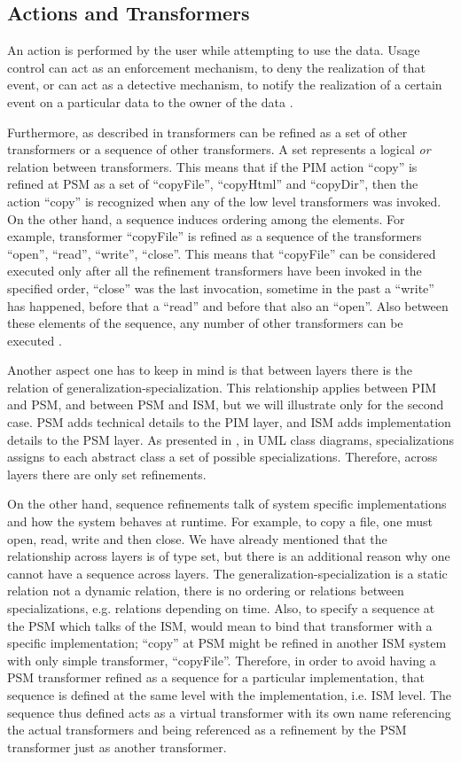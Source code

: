 \documentclass{sig-alternate}
\begin{document}
\subsection{Actions and Transformers}
An action is performed by the user while attempting to use the data.
Usage control can act as an enforcement mechanism, to deny the realization of that event, 
or can act as a detective mechanism, to notify the realization of a certain event on a particular data to the owner of the data \cite{conference3}.

Furthermore, as described in \cite{proceeding4} transformers can be refined as a set of other transformers or a sequence of other transformers.
A set represents a logical \textit{or} relation between transformers. 
This means that if the PIM action ``copy'' is refined at PSM as a set of ``copyFile'', ``copyHtml'' and ``copyDir'', 
then the action ``copy'' is recognized when any of the low level transformers was invoked.
On the other hand, a sequence induces ordering among the elements.
For example, transformer ``copyFile'' is refined as a sequence of the transformers ``open'', ``read'', ``write'', ``close''.
This means that ``copyFile'' can be considered executed only after all the refinement transformers have been invoked in the specified order,
``close'' was the last invocation, sometime in the past a ``write'' has happened,  before that a ``read'' and before that also an ``open''.
Also between these elements of the sequence, any number of other transformers can be executed \cite{proceeding4}.

Another aspect one has to keep in mind is that between layers there is the relation of generalization-specialization.
This relationship applies between PIM and PSM, and between PSM and ISM, but we will illustrate only for the second case.
PSM adds technical details to the PIM layer, and ISM adds implementation details to the PSM layer.
As presented in \cite{Uml1}, in UML class diagrams, specializations assigns to each abstract class a set of possible specializations.
Therefore, across layers there are only set refinements.

On the other hand, sequence refinements talk of system specific implementations and how the system behaves at runtime.
For example, to copy a file, one must open, read, write and then close.
We have already mentioned that the relationship across layers is of type set, 
but there is an additional reason why one cannot have a sequence across layers.
The generalization-specialization is a static relation not a dynamic relation,
there is no ordering or relations between specializations, e.g. relations depending on time.
Also, to specify a sequence at the PSM which talks of the ISM, would mean to bind that transformer with a specific implementation;
``copy'' at PSM might be refined in another ISM system with only simple transformer, ``copyFile''.
Therefore, in order to avoid having a PSM transformer refined as a sequence for a particular implementation,
that sequence is defined at the same level with the implementation, i.e. ISM level.
The sequence thus defined acts as a virtual transformer with its own name
referencing the actual transformers and being referenced as a refinement by the 
PSM transformer just as another transformer.
\end{document}
